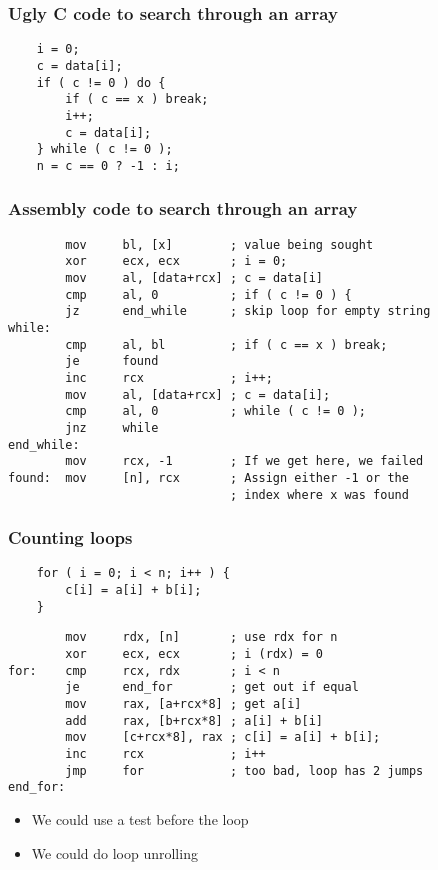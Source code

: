 \documentclass{beamer}
\begin{document}
\begin{frame}[fragile]
    \frametitle{Ugly C code to search through an array}
\begin{verbatim}
    i = 0;
    c = data[i];
    if ( c != 0 ) do {
        if ( c == x ) break;
        i++;
        c = data[i];
    } while ( c != 0 );
    n = c == 0 ? -1 : i;
\end{verbatim}
\end{frame}

\begin{frame}[fragile]
    \frametitle{Assembly code to search through an array}
    \begin{verbatim}
        mov     bl, [x]        ; value being sought
        xor     ecx, ecx       ; i = 0;
        mov     al, [data+rcx] ; c = data[i]
        cmp     al, 0          ; if ( c != 0 ) {
        jz      end_while      ; skip loop for empty string
while:
        cmp     al, bl         ; if ( c == x ) break; 
        je      found
        inc     rcx            ; i++;
        mov     al, [data+rcx] ; c = data[i];
        cmp     al, 0          ; while ( c != 0 );
        jnz     while
end_while:
        mov     rcx, -1        ; If we get here, we failed
found:  mov     [n], rcx       ; Assign either -1 or the 
                               ; index where x was found
    \end{verbatim}

\end{frame}

\begin{frame}[fragile]
    \frametitle{Counting loops}
\begin{verbatim}
    for ( i = 0; i < n; i++ ) {
        c[i] = a[i] + b[i];
    }
\end{verbatim}
\begin{verbatim}
        mov     rdx, [n]       ; use rdx for n
        xor     ecx, ecx       ; i (rdx) = 0
for:    cmp     rcx, rdx       ; i < n
        je      end_for        ; get out if equal
        mov     rax, [a+rcx*8] ; get a[i]
        add     rax, [b+rcx*8] ; a[i] + b[i]
        mov     [c+rcx*8], rax ; c[i] = a[i] + b[i];
        inc     rcx            ; i++
        jmp     for            ; too bad, loop has 2 jumps
end_for:
\end{verbatim}
    \begin{itemize}
        \item We could use a test before the loop
        \item We could do loop unrolling
    \end{itemize}
\end{frame}
\end{document}
